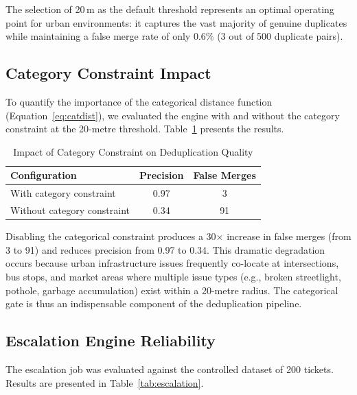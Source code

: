 \documentclass[conference]{IEEEtran}
\begin{document}
The selection of 20\,m as the default threshold represents an optimal operating point for urban environments: it captures the vast majority of genuine duplicates while maintaining a false merge rate of only 0.6\% (3 out of 500 duplicate pairs).

\subsection{Category Constraint Impact}

To quantify the importance of the categorical distance function (Equation~\ref{eq:catdist}), we evaluated the engine with and without the category constraint at the 20-metre threshold. Table~\ref{tab:catimpact} presents the results.

\begin{table}[htbp]
\caption{Impact of Category Constraint on Deduplication Quality}
\begin{center}
\begin{tabular}{lcc}
\toprule
\textbf{Configuration} & \textbf{Precision} & \textbf{False Merges} \\
\midrule
With category constraint & 0.97 & 3 \\
Without category constraint & 0.34 & 91 \\
\bottomrule
\end{tabular}
\label{tab:catimpact}
\end{center}
\end{table}

Disabling the categorical constraint produces a 30$\times$ increase in false merges (from 3 to 91) and reduces precision from 0.97 to 0.34. This dramatic degradation occurs because urban infrastructure issues frequently co-locate at intersections, bus stops, and market areas where multiple issue types (e.g., broken streetlight, pothole, garbage accumulation) exist within a 20-metre radius. The categorical gate is thus an indispensable component of the deduplication pipeline.

\subsection{Escalation Engine Reliability}

The escalation job was evaluated against the controlled dataset of 200 tickets. Results are presented in Table~\ref{tab:escalation}.
\end{document}
